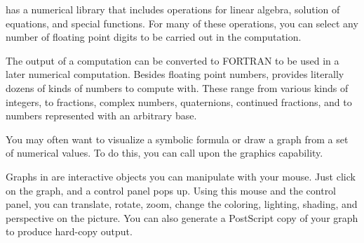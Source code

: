 \Language{} has a numerical library that includes operations for
linear algebra, solution of equations, and special functions.
For many of these operations, you can select any number of
floating point digits to be carried out in the computation.

%

The output of a computation can be converted to FORTRAN to be used
in a later numerical computation.
Besides floating point numbers, \Language{} provides literally
dozens of kinds of numbers to compute with.
These range from various kinds of integers, to fractions, complex
numbers, quaternions, continued fractions, and to numbers represented
with an arbitrary base.

%



You may often want to visualize a symbolic formula or draw
a graph from a set of numerical values.
To do this, you can call upon the \Language{}
graphics capability.


Graphs in \Language{} are interactive objects you can manipulate with
your mouse.
Just click on the graph, and a control panel pops up.
Using this mouse and the control panel, you can translate,
rotate, zoom,
change the coloring, lighting, shading, and
perspective on the picture.
You can also generate a PostScript copy of your graph to produce
hard-copy output.

